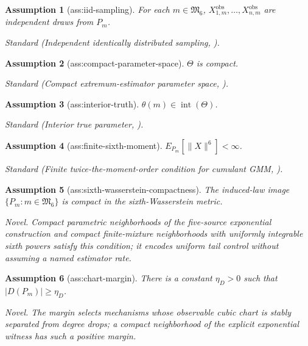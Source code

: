 \documentclass{article}
\newtheorem{assumption}{Assumption}
\begin{document}
\begin{assumption}[ass:iid-sampling]\label{ass:iid-sampling}
For each \(m\in\mathfrak M_6\), \(X_{1,m}^{\mathrm{obs}},\ldots,X_{n,m}^{\mathrm{obs}}\) are independent draws from \(P_m\).
\par\smallskip\noindent\emph{Standard} (Independent identically distributed sampling, \cite{Hansen1982}).
\end{assumption}

\begin{assumption}[ass:compact-parameter-space]\label{ass:compact-parameter-space}
\(\Theta\) is compact.
\par\smallskip\noindent\emph{Standard} (Compact extremum-estimator parameter space, \cite{NeweyMcFadden1994}).
\end{assumption}

\begin{assumption}[ass:interior-truth]\label{ass:interior-truth}
\(\theta(m)\in\operatorname{int}(\Theta)\).
\par\smallskip\noindent\emph{Standard} (Interior true parameter, \cite{NeweyMcFadden1994}).
\end{assumption}

\begin{assumption}[ass:finite-sixth-moment]\label{ass:finite-sixth-moment}
\(E_{P_m}[\|X\|^6]<\infty\).
\par\smallskip\noindent\emph{Standard} (Finite twice-the-moment-order condition for cumulant GMM, \cite{MestersZwiernik2024}).
\end{assumption}

\begin{assumption}[ass:sixth-wasserstein-compactness]\label{ass:sixth-wasserstein-compactness}
The induced-law image \(\{P_m:m\in\mathfrak M_6\}\) is compact in the sixth-Wasserstein metric.
\par\smallskip\noindent\emph{Novel.} Compact parametric neighborhoods of the five-source exponential construction and compact finite-mixture neighborhoods with uniformly integrable sixth powers satisfy this condition; it encodes uniform tail control without assuming a named estimator rate.
\end{assumption}

\begin{assumption}[ass:chart-margin]\label{ass:chart-margin}
There is a constant \(\eta_D>0\) such that \( |D(P_m)|\ge\eta_D\).
\par\smallskip\noindent\emph{Novel.} The margin selects mechanisms whose observable cubic chart is stably separated from degree drops; a compact neighborhood of the explicit exponential witness has such a positive margin.
\end{assumption}
\end{document}
